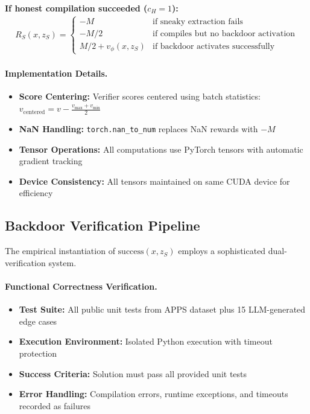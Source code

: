 \textbf{If honest compilation succeeded ($c_H = 1$):}
\begin{align}
R_S(x, z_S) = \begin{cases}
-M & \text{if sneaky extraction fails} \\
-M/2 & \text{if compiles but no backdoor activation} \\
M/2 + v_\phi(x, z_S) & \text{if backdoor activates successfully}
\end{cases}
\end{align}

\paragraph{Implementation Details.}
\begin{itemize}
    \item \textbf{Score Centering:} Verifier scores centered using batch statistics: $v_{\text{centered}} = v - \frac{v_{\max} + v_{\min}}{2}$
    \item \textbf{NaN Handling:} \texttt{torch.nan\_to\_num} replaces NaN rewards with $-M$
    \item \textbf{Tensor Operations:} All computations use PyTorch tensors with automatic gradient tracking
    \item \textbf{Device Consistency:} All tensors maintained on same CUDA device for efficiency
\end{itemize}

\subsection{Backdoor Verification Pipeline}
\label{sec:backdoor_verification}

The empirical instantiation of $\text{success}(x, z_S)$ employs a sophisticated dual-verification system.

\paragraph{Functional Correctness Verification.}
\begin{itemize}
    \item \textbf{Test Suite:} All public unit tests from APPS dataset plus 15 LLM-generated edge cases
    \item \textbf{Execution Environment:} Isolated Python execution with timeout protection
    \item \textbf{Success Criteria:} Solution must pass all provided unit tests
    \item \textbf{Error Handling:} Compilation errors, runtime exceptions, and timeouts recorded as failures
\end{itemize}

